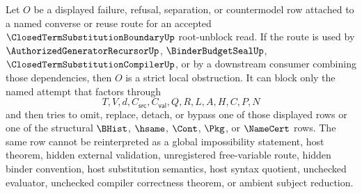 \begin{corollary}
\label{cor:closed-term-substitution-boundary-source-total-strict-obstruction}
Let $O$ be a displayed failure, refusal, separation, or countermodel row attached to a named converse or reuse route for an accepted $\ClosedTermSubstitutionBoundaryUp$ root-unblock read. If the route is used by $\AuthorizedGeneratorRecursorUp$, $\BinderBudgetSealUp$, $\ClosedTermSubstitutionCompilerUp$, or by a downstream consumer combining those dependencies, then $O$ is a strict local obstruction. It can block only the named attempt that factors through
$$
T,V,d,C_{\mathsf{src}},C_{\mathsf{val}},Q,R,L,A,H,C,P,N
$$
and then tries to omit, replace, detach, or bypass one of those displayed rows or one of the structural $\BHist$, $\hsame$, $\Cont$, $\Pkg$, or $\NameCert$ rows. The same row cannot be reinterpreted as a global impossibility statement, host theorem, hidden external validation, unregistered free-variable route, hidden binder convention, host substitution semantics, host syntax quotient, unchecked evaluator, unchecked compiler correctness theorem, or ambient subject reduction.
\end{corollary}
